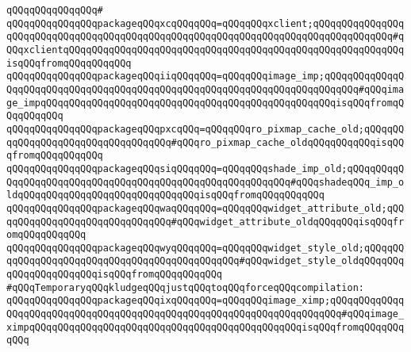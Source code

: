 \verb|qQQqqQQqqQQqqQQq#|\newline
\verb|qQQqqQQqqQQqqQQqpackageqQQqxcqQQqqQQq=qQQqqQQqxclient;qQQqqQQqqQQqqQQqqQQqqQQqqQQqqQQqqQQqqQQqqQQqqQQqqQQqqQQqqQQqqQQqqQQqqQQqqQQqqQQqqQQq#qQQqxclientqQQqqQQqqQQqqQQqqQQqqQQqqQQqqQQqqQQqqQQqqQQqqQQqqQQqqQQqqQQqisqQQqfromqQQqqQQqqQQq|\newline
\verb|qQQqqQQqqQQqqQQqpackageqQQqiiqQQqqQQq=qQQqqQQqimage_imp;qQQqqQQqqQQqqQQqqQQqqQQqqQQqqQQqqQQqqQQqqQQqqQQqqQQqqQQqqQQqqQQqqQQqqQQqqQQq#qQQqimage_impqQQqqQQqqQQqqQQqqQQqqQQqqQQqqQQqqQQqqQQqqQQqqQQqqQQqisqQQqfromqQQqqQQqqQQq|\newline
\verb|qQQqqQQqqQQqqQQqpackageqQQqpxcqQQq=qQQqqQQqro_pixmap_cache_old;qQQqqQQqqQQqqQQqqQQqqQQqqQQqqQQqqQQq#qQQqro_pixmap_cache_oldqQQqqQQqqQQqisqQQqfromqQQqqQQqqQQq|\newline
\verb|qQQqqQQqqQQqqQQqpackageqQQqsiqQQqqQQq=qQQqqQQqshade_imp_old;qQQqqQQqqQQqqQQqqQQqqQQqqQQqqQQqqQQqqQQqqQQqqQQqqQQqqQQqqQQq#qQQqshadeqQQq_imp_oldqQQqqQQqqQQqqQQqqQQqqQQqqQQqqQQqisqQQqfromqQQqqQQqqQQq|\newline
\verb|qQQqqQQqqQQqqQQqpackageqQQqwaqQQqqQQq=qQQqqQQqwidget_attribute_old;qQQqqQQqqQQqqQQqqQQqqQQqqQQqqQQq#qQQqwidget_attribute_oldqQQqqQQqisqQQqfromqQQqqQQqqQQq|\newline
\verb|qQQqqQQqqQQqqQQqpackageqQQqwyqQQqqQQq=qQQqqQQqwidget_style_old;qQQqqQQqqQQqqQQqqQQqqQQqqQQqqQQqqQQqqQQqqQQqqQQq#qQQqwidget_style_oldqQQqqQQqqQQqqQQqqQQqqQQqisqQQqfromqQQqqQQqqQQq|\newline
\newline
\verb|#qQQqTemporaryqQQqkludgeqQQqjustqQQqtoqQQqforceqQQqcompilation:|\newline
\verb|qQQqqQQqqQQqqQQqpackageqQQqixqQQqqQQq=qQQqqQQqimage_ximp;qQQqqQQqqQQqqQQqqQQqqQQqqQQqqQQqqQQqqQQqqQQqqQQqqQQqqQQqqQQqqQQqqQQqqQQq#qQQqimage_ximpqQQqqQQqqQQqqQQqqQQqqQQqqQQqqQQqqQQqqQQqqQQqqQQqisqQQqfromqQQqqQQqqQQq|\newline
